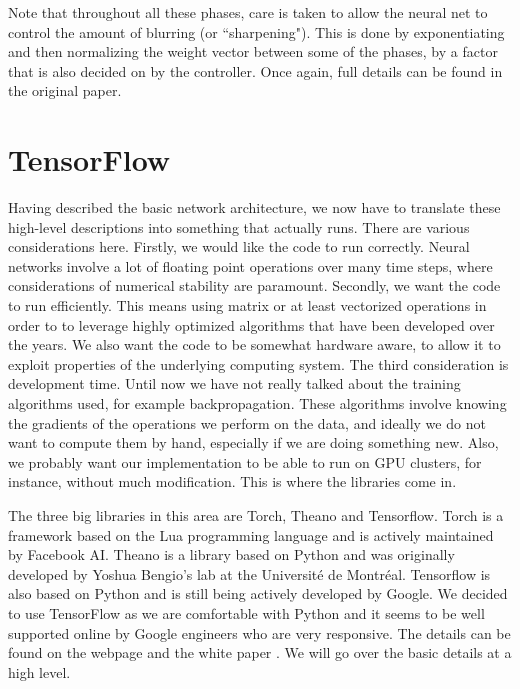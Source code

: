 \documentclass[12pt]{article}
\begin{document}
Note that throughout all these phases, care is taken to allow the neural net
to control the amount of blurring (or ``sharpening").
This is done by exponentiating and then
normalizing the weight vector between some of the phases, by a factor that is also
decided on by the controller. Once again, full details can be found in the original
paper.

\section{TensorFlow}\label{tensorflow}

Having described the basic network architecture, we now have to translate
these high-level descriptions into something that actually runs. There
are various considerations here. Firstly, we would like the code to 
run correctly. Neural networks involve a lot of floating point operations
over many time steps, where considerations of numerical stability
are paramount. Secondly, we want the code to run efficiently.
This means using matrix or at least vectorized operations in order to to
leverage highly optimized algorithms that have been developed over the years.
We also want the code to be somewhat hardware aware, to allow it to
exploit properties of the underlying computing system. The third consideration
is development time. Until now we have not really talked about the training
algorithms used, for example backpropagation. These algorithms involve knowing the
gradients of the operations we perform on the data, and ideally we do not want
to compute them by hand, especially if we are doing something new. Also,
we probably want our implementation to be able to run on GPU clusters, for instance,
without much modification. This is where the libraries come in.

The three big libraries in this area are Torch, Theano and Tensorflow. Torch is a framework
based on the Lua programming language and is actively maintained by Facebook AI. Theano
is a library based on Python and was originally developed by Yoshua Bengio's lab
at the Universit\'e de Montr\'eal. Tensorflow is also based on Python and is still
being actively developed by Google. We decided to use TensorFlow as we are comfortable
with Python and it seems to be well supported online by Google engineers
who are very responsive. The details can be found on the webpage and the white paper
\cite{tensorflow2015-whitepaper}. We will go over the basic details at a high level.
\end{document}
